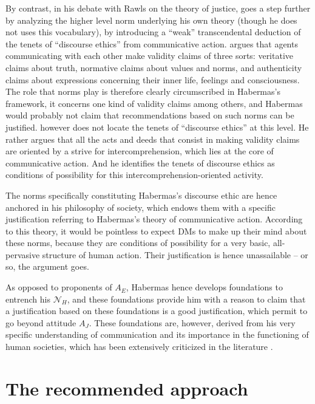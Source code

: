 \documentclass[preprint, french, english, 11pt, authoryear]{elsarticle}%
\begin{document}
By contrast, in his debate with Rawls on the theory of justice, \citet{habermas_moralbewustsein_1983} goes a step further by analyzing the higher level norm underlying his own theory (though he does not uses this vocabulary),
by introducing a “weak” transcendental deduction of the tenets of “discourse ethics” from communicative action. 
\citet{habermas_theorie_1981} argues that agents communicating with each other make validity claims of three sorts: veritative claims about truth, normative claims about values and norms, and authenticity claims about expressions concerning their inner life, feelings and consciousness. 
The role that norms play is therefore clearly circumscribed in Habermas's framework, it concerns one kind of validity claims among others, and Habermas would probably not claim that recommendations based on such norms can be justified. 
\cite{habermas_moralbewustsein_1983} however does not locate the tenets of “discourse ethics” at this level. 
He rather argues that all the acts and deeds that consist in making validity claims are oriented by a strive for intercomprehension, which lies at the core of communicative action. And he identifies the tenets of discourse ethics as conditions of possibility for this intercomprehension-oriented activity. 


The norms specifically constituting Habermas's discourse ethic are hence anchored in his philosophy of society, which endows them with a specific justification referring to Habermas's theory of communicative action.
According to this theory, it would be pointless to expect \acp{DM} to make up their mind about these norms, because 
they are conditions of possibility for a very basic, all-pervasive structure of human action. Their justification is hence unassailable -- or so, the argument goes.

As opposed to proponents of $A_E$, Habermas hence develops foundations to entrench his $\mathscr{N}_{H}$, and these foundations provide him with a reason to claim that a justification based on these foundations is a good justification, which permit to go beyond attitude $A_J$. 
These foundations are, however, derived from his very specific understanding of communication and its importance in the functioning of human societies, which has been extensively criticized in the literature \citep{heath_communicative_2001,honneth_kritik_1985,benhabib_situating_1992}. 


\section{The recommended approach}
\label{sec:recomm}
\end{document}
